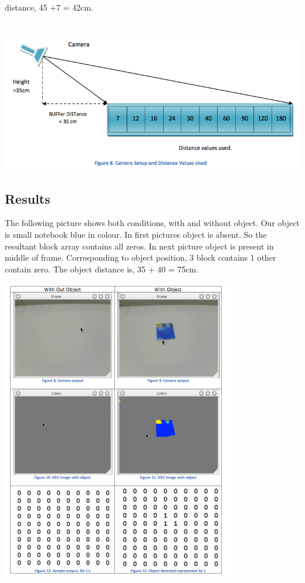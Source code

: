 \documentclass[12pt]{article}
\begin{document}
distance, 45 +7 = 42cm.\\
\\
\begin{center} \includegraphics[scale=0.4]{a5} \end{center}
\subsection{Results}
The following picture shows both conditions, with and without object. Our object is small notebook blue in colour. In first pictures object is absent. So the resultant block array contains all zeros. In next picture object is present in middle of frame. Corresponding to object position, 3 block contains 1 other contain zero. The object distance is, 35 + 40 = 75cm.
\begin{center} \includegraphics[scale=0.4]{a6} \end{center}
\end{document}
